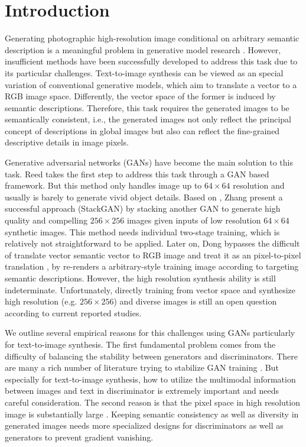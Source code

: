 \documentclass[10pt,twocolumn,letterpaper]{article}
\begin{document}
\section{Introduction}
Generating photographic high-resolution image conditional on arbitrary semantic description is a meaningful problem in generative model research \cite{reed2016generative}. However, insufficient methods have been successfully developed to address this task due to its particular challenges. Text-to-image synthesis can be viewed as an special variation of conventional generative models, which aim to translate a vector to a RGB image space.  Differently, the vector space of the former is induced by semantic descriptions. Therefore, this task requires the generated images to be semantically consistent, i.e., the generated images not only reflect the principal concept of descriptions in global images but also can reflect the fine-grained descriptive details in image pixels. 

Generative adversarial networks (GANs) have become the main solution to this task. 
Reed \etal \cite{reed2016generative} takes the first step to address this task through a GAN based framework. But this method only handles image up to $64{\times}64$ resolution and usually is barely to generate vivid object details.
Based on \cite{reed2016generative}, Zhang \etal \cite{han2017stackganan} present a successful approach (StackGAN) by stacking another GAN to generate high quality and compelling $256{\times}256$ images given inputs of low resolution $64{\times}64$ synthetic images. This method needs individual two-stage training, which is relatively not straightforward to be applied. Later on, Dong \etal \cite{dong2017semantic} 
bypasses the difficult of translate vector semantic vector to RGB image and treat it as an pixel-to-pixel translation \cite{isola2016image}, by re-renders a arbitrary-style training image according to targeting semantic descriptions. However, the high resolution synthesis ability is still indeterminate. 
Unfortunately, directly training from vector space and synthesize high resolution (e.g. $256{\times}256$) and diverse images is still an open question according to current reported studies. 

We outline several empirical reasons for this challenges using GANs particularly for text-to-image synthesis. The first fundamental problem comes from the difficulty of balancing the stability between generators and discriminators. There are many a rich number of literature trying to stabilize GAN training \cite{salimans2016improved}. But especially for text-to-image synthesis, how to utilize the multimodal information between images and text in discriminator is extremely important and needs careful consideration. The second reason is that the pixel space in high resolution image is substantially large \cite{han2017stackgan}. Keeping semantic consistency as well as diversity in generated images needs more specialized designs for discriminators as well as generators to prevent gradient vanishing. 
\end{document}
